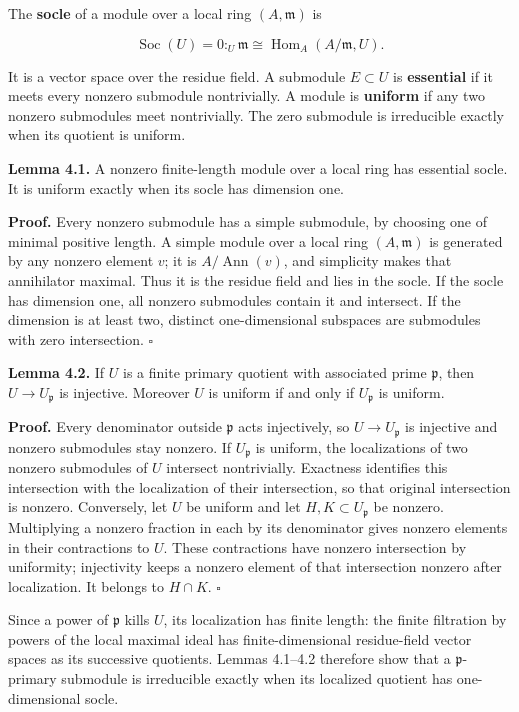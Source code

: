 \documentclass[
]{article}
\begin{document}
The \textbf{socle} of a module over a local ring \((A,\mathfrak m)\) is

\[
\operatorname{Soc}(U)=0:_U\mathfrak m
\cong\operatorname{Hom}_A(A/\mathfrak m,U).
\]

It is a vector space over the residue field. A submodule \(E\subset U\)
is \textbf{essential} if it meets every nonzero submodule nontrivially.
A module is \textbf{uniform} if any two nonzero submodules meet
nontrivially. The zero submodule is irreducible exactly when its
quotient is uniform.

\textbf{Lemma 4.1.} A nonzero finite-length module over a local ring has
essential socle. It is uniform exactly when its socle has dimension one.

\textbf{Proof.} Every nonzero submodule has a simple submodule, by
choosing one of minimal positive length. A simple module over a local
ring \((A,\mathfrak m)\) is generated by any nonzero element \(v\); it
is \(A/\operatorname{Ann}(v)\), and simplicity makes that annihilator
maximal. Thus it is the residue field and lies in the socle. If the
socle has dimension one, all nonzero submodules contain it and
intersect. If the dimension is at least two, distinct one-dimensional
subspaces are submodules with zero intersection. \(\square\)

\textbf{Lemma 4.2.} If \(U\) is a finite primary quotient with
associated prime \(\mathfrak p\), then \(U\to U_{\mathfrak p}\) is
injective. Moreover \(U\) is uniform if and only if \(U_{\mathfrak p}\)
is uniform.

\textbf{Proof.} Every denominator outside \(\mathfrak p\) acts
injectively, so \(U\to U_{\mathfrak p}\) is injective and nonzero
submodules stay nonzero. If \(U_{\mathfrak p}\) is uniform, the
localizations of two nonzero submodules of \(U\) intersect nontrivially.
Exactness identifies this intersection with the localization of their
intersection, so that original intersection is nonzero. Conversely, let
\(U\) be uniform and let \(H,K\subset U_{\mathfrak p}\) be nonzero.
Multiplying a nonzero fraction in each by its denominator gives nonzero
elements in their contractions to \(U\). These contractions have nonzero
intersection by uniformity; injectivity keeps a nonzero element of that
intersection nonzero after localization. It belongs to \(H\cap K\).
\(\square\)

Since a power of \(\mathfrak p\) kills \(U\), its localization has
finite length: the finite filtration by powers of the local maximal
ideal has finite-dimensional residue-field vector spaces as its
successive quotients. Lemmas 4.1--4.2 therefore show that a
\(\mathfrak p\)-primary submodule is irreducible exactly when its
localized quotient has one-dimensional socle.
\end{document}
